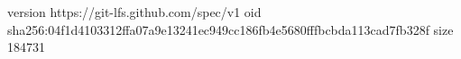 version https://git-lfs.github.com/spec/v1
oid sha256:04f1d4103312ffa07a9e13241ec949cc186fb4e5680fffbcbda113cad7fb328f
size 184731
